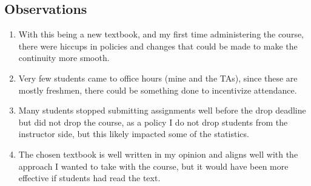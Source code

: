 \documentclass[11pt]{article}
\begin{document}
\subsection{Observations}
\begin{enumerate}
\item With this being a new textbook, and my first time administering the course, there were hiccups in policies and changes that could be made to make the continuity more smooth. 
\item Very few students came to office hours (mine and the TAs), since these are mostly freshmen, there could be something done to incentivize attendance. 
\item Many students stopped submitting assignments well before the drop deadline but did not drop the course, as a policy I do not drop students from the instructor side, but this likely impacted some of the statistics. 
\item The chosen textbook is well written in my opinion and aligns well with the approach I wanted to take with the course, but it would have been more effective if students had read the text. 
\end{enumerate}
\end{document}
